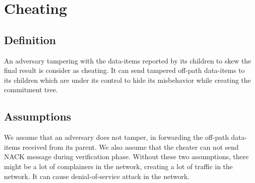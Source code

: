\chapter{Cheating}

\section{Definition}
	An adversary tampering with the data-items reported by its children to skew the final result is consider as cheating.
	It can send tampered off-path data-items to its children which are under its control to hide its misbehavior while creating the commitment tree.

\section{Assumptions}
	We assume that an adversary does not tamper, in forwarding the off-path data-items received from its parent.
	We also assume that the cheater can not send NACK message during verification phase.
	Without these two assumptions, there might be a lot of complainers in the network, creating a lot of traffic in the network.
	It can cause denial-of-service attack in the network.

